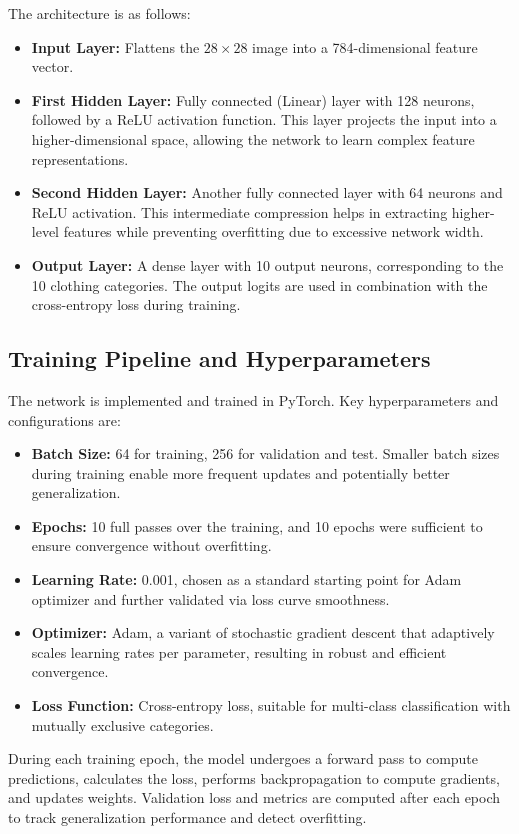 \documentclass[a4paper, journal]{IEEEtran}
\begin{document}
The architecture is as follows:
\begin{itemize}
    \item \textbf{Input Layer:} Flattens the $28 \times 28$ image into a 784-dimensional feature vector.
    \item \textbf{First Hidden Layer:} Fully connected (Linear) layer with 128 neurons, followed by a ReLU activation function. This layer projects the input into a higher-dimensional space, allowing the network to learn complex feature representations.
    \item \textbf{Second Hidden Layer:} Another fully connected layer with 64 neurons and ReLU activation. This intermediate compression helps in extracting higher-level features while preventing overfitting due to excessive network width.
    \item \textbf{Output Layer:} A dense layer with 10 output neurons, corresponding to the 10 clothing categories. The output logits are used in combination with the cross-entropy loss during training.
\end{itemize}

\subsection{Training Pipeline and Hyperparameters}
The network is implemented and trained in PyTorch. Key hyperparameters and configurations are:
\begin{itemize}
    \item \textbf{Batch Size:} 64 for training, 256 for validation and test. Smaller batch sizes during training enable more frequent updates and potentially better generalization.
    \item \textbf{Epochs:} 10 full passes over the training, and 10 epochs were sufficient to ensure convergence without overfitting.
    \item \textbf{Learning Rate:} 0.001, chosen as a standard starting point for Adam optimizer and further validated via loss curve smoothness.
    \item \textbf{Optimizer:} Adam, a variant of stochastic gradient descent that adaptively scales learning rates per parameter, resulting in robust and efficient convergence.
    \item \textbf{Loss Function:} Cross-entropy loss, suitable for multi-class classification with mutually exclusive categories.
\end{itemize}

During each training epoch, the model undergoes a forward pass to compute predictions, calculates the loss, performs backpropagation to compute gradients, and updates weights. Validation loss and metrics are computed after each epoch to track generalization performance and detect overfitting.
\end{document}
